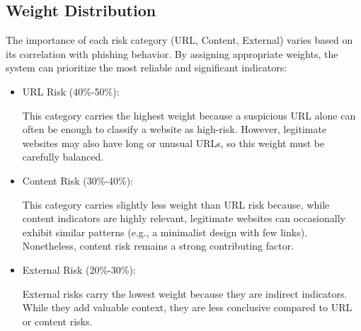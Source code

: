 \documentclass[11pt]{article}
\begin{document}
\subsection{Weight Distribution}

The importance of each risk category (URL, Content, External) varies based on its correlation with phishing behavior. By assigning appropriate weights, the system can prioritize the most reliable and significant indicators:

\begin{itemize}
    \item URL Risk (40\%-50\%):
    
    This category carries the highest weight because a suspicious URL alone can often be enough to classify a website as high-risk. However, legitimate websites may also have long or unusual URLs, so this weight must be carefully balanced.

    \item Content Risk (30\%-40\%):
    
    This category carries slightly less weight than URL risk because, while content indicators are highly relevant, legitimate websites can occasionally exhibit similar patterns (e.g., a minimalist design with few links). Nonetheless, content risk remains a strong contributing factor.

    \item External Risk (20\%-30\%):
    
    External risks carry the lowest weight because they are indirect indicators. While they add valuable context, they are less conclusive compared to URL or content risks.

\end{itemize}
\end{document}
